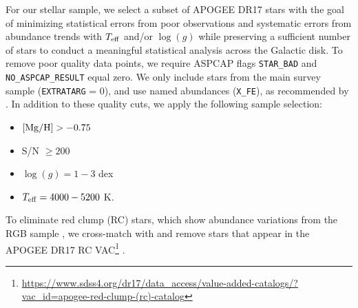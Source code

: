\documentclass[modern]{aastex631}
\newcommand{\mgh}{[{\rm Mg}/{\rm H}]}
\newcommand{\logg}{\log(g)}
\newcommand{\teff}{T_{\rm eff}}
\begin{document}
For our stellar sample, we select a subset of APOGEE DR17 stars with the goal of minimizing statistical errors from poor observations and systematic errors from abundance trends with $\teff$ and/or $\logg$ while preserving a sufficient number of stars to conduct a meaningful statistical analysis across the Galactic disk. To remove poor quality data points, we require ASPCAP flags \texttt{STAR\_BAD} and \texttt{NO\_ASPCAP\_RESULT} equal zero. We only include stars from the main survey sample (\texttt{EXTRATARG} = 0), and use named abundances (\texttt{X\_FE}), as recommended by \citet{jonsson2020}. In addition to these quality cuts, we apply the following sample selection:
\begin{itemize}
\itemsep0em
    \item $\mgh > -0.75$
    \item S/N $\geq 200$
    \item $\logg = 1-3$ dex
    \item $\teff = 4000-5200$ K.
\end{itemize}
To eliminate red clump (RC) stars, which show abundance variations from the RGB sample \citep{vincenzo2021a}, we cross-match with and remove stars that appear in the APOGEE DR17 RC VAC\footnote{\url{https://www.sdss4.org/dr17/data_access/value-added-catalogs/?vac_id=apogee-red-clump-(rc)-catalog}} \citep{bovy2014}. 
\end{document}

